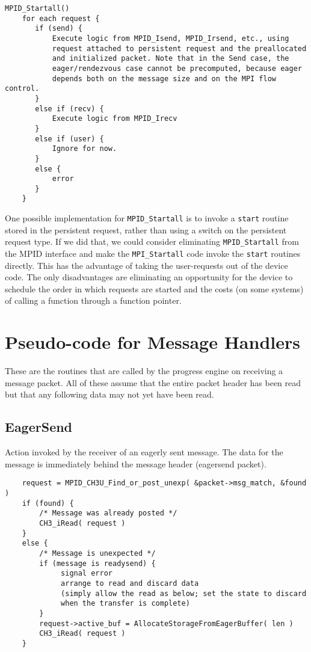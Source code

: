 \documentclass{article}
\def\code{\begingroup\makeustext\eatcode}
\def\eatcode#1{\texttt{#1}\endgroup}
\begin{document}
\begin{verbatim}
MPID_Startall()
    for each request {
       if (send) {
           Execute logic from MPID_Isend, MPID_Irsend, etc., using
           request attached to persistent request and the preallocated 
           and initialized packet. Note that in the Send case, the 
           eager/rendezvous case cannot be precomputed, because eager
           depends both on the message size and on the MPI flow control.
       }
       else if (recv) {
           Execute logic from MPID_Irecv
       }
       else if (user) {
           Ignore for now.  
       }
       else {
           error
       }
    }
\end{verbatim}
One possible implementation for \code{MPID_Startall} is to invoke a
\code{start} routine stored in the persistent request, rather than using a 
switch on the persistent request type.  If we did that, we could consider 
eliminating \code{MPID_Startall} from the MPID interface and make the
\code{MPI_Startall} code invoke the \code{start} routines directly.  This has
the advantage of taking the user-requests out of the device code.  The only
disadvantages are eliminating an opportunity for the device to schedule the
order in which requests are started and the costs (on some systems) of calling
a function through a function pointer.

\section{Pseudo-code for Message Handlers}
These are the routines that are called by the progress engine on receiving a
message packet.  All of these assume that the entire packet header has been 
read but that any following data may not yet have been read.

\subsection{EagerSend}
Action invoked by the receiver of an eagerly sent message.  The data for the
message is immediately behind the message header (eagersend packet).
\begin{verbatim}
    request = MPID_CH3U_Find_or_post_unexp( &packet->msg_match, &found )
    if (found) {
        /* Message was already posted */
        CH3_iRead( request )
    }
    else {
        /* Message is unexpected */
        if (message is readysend) {
             signal error 
             arrange to read and discard data 
             (simply allow the read as below; set the state to discard
             when the transfer is complete)
        }
        request->active_buf = AllocateStorageFromEagerBuffer( len )
        CH3_iRead( request )
    }
\end{verbatim}
\end{document}
